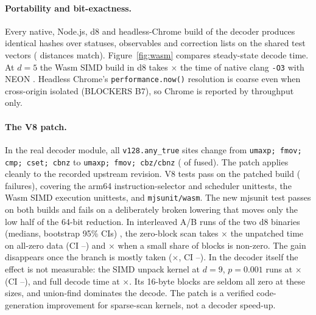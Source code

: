 \paragraph{Portability and bit-exactness.} Every native, Node.js, d8 and headless-Chrome build of the decoder produces
identical hashes over statuses, observables and correction lists on the shared test vectors (
distances match). Figure~\ref{fig:wasm} compares steady-state decode time. At $d=5$ the Wasm SIMD build in d8 takes
$\times$ the time of native clang \texttt{-O3} with NEON . Headless
Chrome's \texttt{performance.now()} resolution is coarse even when cross-origin isolated (BLOCKERS B7), so Chrome is
reported by throughput only.

\paragraph{The V8 patch.} In the real decoder module, all  \texttt{v128.any\_true} sites
change from \texttt{umaxp; fmov; cmp; cset; cbnz} to \texttt{umaxp; fmov; cbz/cbnz} ( of
 fused). The patch applies cleanly to the recorded upstream revision.  V8
tests pass on the patched build ( failures), covering the arm64 instruction-selector and
scheduler unittests, the Wasm SIMD execution unittests, and \texttt{mjsunit/wasm}. The new mjsunit test passes on
both builds and fails on a deliberately broken lowering that moves only the low half of the 64-bit reduction. In
interleaved A/B runs of the two d8 binaries (medians, bootstrap 95\% CIs) , the zero-block scan
takes $\times$ the unpatched time on all-zero data (CI --)
and $\times$ when a small share of blocks is non-zero. The gain disappears once the branch
is mostly taken ($\times$, CI --). In the
decoder itself the effect is not measurable: the SIMD unpack kernel at $d=9$, $p=0.001$ runs at
$\times$ (CI --), and full decode
time at $\times$. Its 16-byte blocks are seldom all zero at these sizes, and union-find
dominates the decode. The patch is a verified code-generation improvement for sparse-scan kernels, not a decoder
speed-up.

